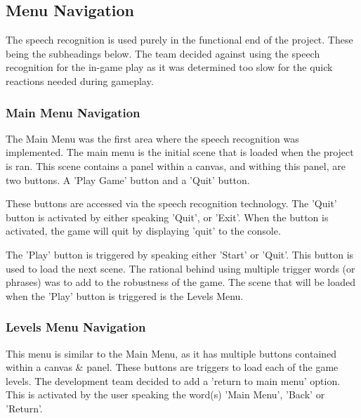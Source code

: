 \documentclass{article}
\begin{document}
\subsection{Menu Navigation}
The speech recognition is used purely in the functional end of the project. These being the subheadings below. The team decided against using the speech recognition for the in-game play as it was determined too slow for the quick reactions needed during gameplay.

\subsubsection{Main Menu Navigation}
The Main Menu was the first area where the speech recognition was implemented. The main menu is the initial scene that is loaded when the project is ran. This scene contains a panel within a canvas, and withing this panel, are two buttons. A 'Play Game' button and a 'Quit' button.

\bigskip

These buttons are accessed via the speech recognition technology. The 'Quit' button is activated by either speaking 'Quit', or 'Exit'. When the button is activated, the game will quit by displaying 'quit' to the console.

\bigskip

The 'Play' button is triggered by speaking either 'Start' or 'Quit'. This button is used to load the next scene. The rational behind using multiple trigger words (or phrases) was to add to the robustness of the game. The scene that will be loaded when the 'Play' button is triggered is the Levels Menu.

\subsubsection{Levels Menu Navigation}
This menu is similar to the Main Menu, as it has multiple buttons contained within a canvas \& panel. These buttons are triggers to load each of the game levels. The development team decided to add a 'return to main menu' option. This is activated by the user speaking the word(s) 'Main Menu', 'Back' or 'Return'.

\bigskip
\end{document}
